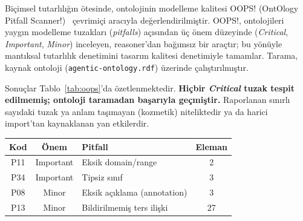 \documentclass[10pt, a4paper, twocolumn]{article}
\begin{document}
Biçimsel tutarlılığın ötesinde, ontolojinin modelleme kalitesi OOPS! (OntOlogy Pitfall Scanner!)~\cite{poveda2014oops} çevrimiçi aracıyla değerlendirilmiştir. OOPS!, ontolojileri yaygın modelleme tuzakları (\textit{pitfalls}) açısından üç önem düzeyinde (\textit{Critical}, \textit{Important}, \textit{Minor}) inceleyen, reasoner'dan bağımsız bir araçtır; bu yönüyle mantıksal tutarlılık denetimini tasarım kalitesi denetimiyle tamamlar. Tarama, kaynak ontoloji (\texttt{agentic-ontology.rdf}) üzerinde çalıştırılmıştır.

Sonuçlar Tablo~\ref{tab:oops}'da özetlenmektedir. \textbf{Hiçbir \textit{Critical} tuzak tespit edilmemiş; ontoloji taramadan başarıyla geçmiştir.} Raporlanan sınırlı sayıdaki tuzak ya anlam taşımayan (kozmetik) niteliktedir ya da harici import'tan kaynaklanan yan etkilerdir.

\begin{center}
\scriptsize
\setlength{\tabcolsep}{4pt}
\begin{tabular}{|c|c|p{2.7cm}|c|}
\hline
\textbf{Kod} & \textbf{Önem} & \textbf{Pitfall} & \textbf{Eleman} \\
\hline
P11 & Important & Eksik domain/range & 2 \\
\hline
P34 & Important & Tipsiz sınıf & 3 \\
\hline
P08 & Minor & Eksik açıklama (annotation) & 3 \\
\hline
P13 & Minor & Bildirilmemiş ters ilişki & 27 \\
\hline
\end{tabular}
\label{tab:oops}
\end{center}
\end{document}
